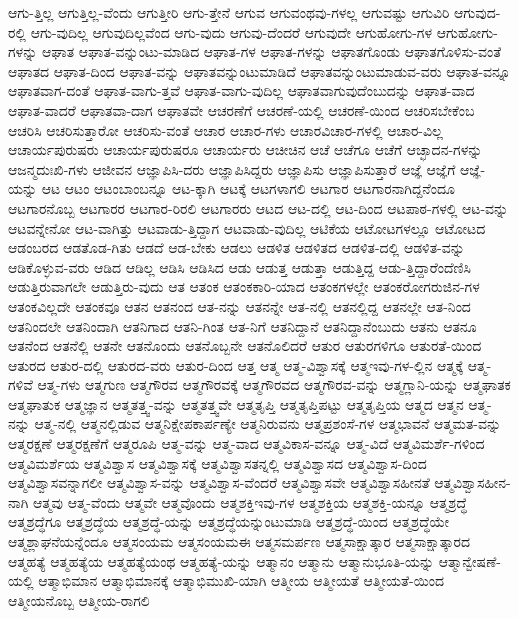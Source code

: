 {ಆಗು-ತ್ತಿಲ್ಲ
ಆಗುತ್ತಿಲ್ಲ-ವೆಂದು
ಆಗುತ್ತೀರಿ
ಆಗು-ತ್ತೇನೆ
ಆಗುವ
ಆಗುವಂಥವು-ಗಳಲ್ಲ
ಆಗುವಷ್ಟು
ಆಗುವಿರಿ
ಆಗುವುದ-ರಲ್ಲಿ
ಆಗು-ವುದಿಲ್ಲ
ಆಗುವುದಿಲ್ಲವೆಂದ
ಆಗು-ವುದು
ಆಗುವು-ದೆಂದರೆ
ಆಗುವುದೇ
ಆಗುಹೋಗು-ಗಳ
ಆಗುಹೋಗು-ಗಳನ್ನು
ಆಘಾತ
ಆಘಾತ-ವನ್ನುಂಟು-ಮಾಡಿದ
ಆಘಾತ-ಗಳ
ಆಘಾತ-ಗಳನ್ನು
ಆಘಾತಗೊಂಡು
ಆಘಾತಗೊಳಿಸು-ವಂತೆ
ಆಘಾತದ
ಆಘಾತ-ದಿಂದ
ಆಘಾತ-ವನ್ನು
ಆಘಾತವನ್ನುಂಟುಮಾಡಿದೆ
ಆಘಾತವನ್ನುಂಟುಮಾಡುವ-ವರು
ಆಘಾತ-ವನ್ನೂ
ಆಘಾತವಾಗ-ದಂತೆ
ಆಘಾತ-ವಾಗು-ತ್ತವೆ
ಆಘಾತ-ವಾಗು-ವುದಿಲ್ಲ
ಆಘಾತವಾಗುವುದೆಂಬುದನ್ನು
ಆಘಾತ-ವಾದ
ಆಘಾತ-ವಾದರೆ
ಆಘಾತವಾ-ದಾಗ
ಆಘಾತವೇ
ಆಚರಣೆಗೆ
ಆಚರಣೆ-ಯಲ್ಲಿ
ಆಚರಣೆ-ಯಿಂದ
ಆಚರಿಸಬೇಕೆಂಬ
ಆಚರಿಸಿ
ಆಚರಿಸುತ್ತಾರೋ
ಆಚರಿಸು-ವಂತೆ
ಆಚಾರ
ಆಚಾರ-ಗಳು
ಆಚಾರವಿಚಾರ-ಗಳಲ್ಲಿ
ಆಚಾರ-ವಿಲ್ಲ
ಆಚಾರ್ಯಪುರುಷರು
ಆಚಾರ್ಯಪುರುಷರೂ
ಆಚಾರ್ಯರು
ಆಚೀಚಿನ
ಆಚೆ
ಆಚೆಗೂ
ಆಚೆಗೆ
ಆಚ್ಛಾದನ-ಗಳನ್ನು
ಆಜನ್ಮದುಃಖಿ-ಗಳು
ಆಜೀವನ
ಆಜ್ಞಾಪಿಸಿ-ದರು
ಆಜ್ಞಾಪಿಸಿದ್ದರು
ಆಜ್ಞಾಪಿಸು
ಆಜ್ಞಾಪಿಸುತ್ತಾರೆ
ಆಜ್ಞೆ
ಆಜ್ಞೆಗೆ
ಆಜ್ಞೆ-ಯನ್ನು
ಆಟ
ಆಟಂ
ಆಟಂಬಾಂಬನ್ನೂ
ಆಟ-ಕ್ಕಾಗಿ
ಆಟಕ್ಕೆ
ಆಟಗಳಾಗಲಿ
ಆಟಗಾರ
ಆಟಗಾರನಾಗಿದ್ದನೆಂದೂ
ಆಟಗಾರನೊಬ್ಬ
ಆಟಗಾರರ
ಆಟಗಾರ-ರಿರಲಿ
ಆಟಗಾರರು
ಆಟದ
ಆಟ-ದಲ್ಲಿ
ಆಟ-ದಿಂದ
ಆಟಪಾಠ-ಗಳಲ್ಲಿ
ಆಟ-ವನ್ನು
ಆಟವನ್ನೇನೋ
ಆಟ-ವಾಗಿತ್ತು
ಆಟವಾಡು-ತ್ತಿದ್ದಾಗ
ಆಟವಾಡು-ವುದಿಲ್ಲ
ಆಟಿಕೆಯ
ಆಟೋಟಗಳಲ್ಲೂ
ಆಟೋಟದ
ಆಡಂಬರದ
ಆಡತೊಡ-ಗಿತು
ಆಡದೆ
ಆಡ-ಬೇಕು
ಆಡಲು
ಆಡಳಿತ
ಆಡಳಿತದ
ಆಡಳಿತ-ದಲ್ಲಿ
ಆಡಳಿತ-ವನ್ನು
ಆಡಿಕೊಳ್ಳುವ-ವರು
ಆಡಿದ
ಆಡಿಲ್ಲ
ಆಡಿಸಿ
ಆಡಿಸಿದ
ಆಡು
ಆಡುತ್ತ
ಆಡುತ್ತಾ
ಆಡುತ್ತಿದ್ದ
ಆಡು-ತ್ತಿದ್ದಾರೆಂದೆಣಿಸಿ
ಆಡುತ್ತಿರುವಾಗಲೇ
ಆಡುತ್ತಿರು-ವುದು
ಆತ
ಆತಂಕ
ಆತಂಕಕಾರಿ-ಯಾದ
ಆತಂಕಗಳಲ್ಲೇ
ಆತಂಕರೋಗರುಜಿನ-ಗಳ
ಆತಂಕವಿಲ್ಲದೇ
ಆತಂಕವೂ
ಆತನ
ಆತನಂದ
ಆತ-ನನ್ನು
ಆತನನ್ನೇ
ಆತ-ನಲ್ಲಿ
ಆತನಲ್ಲಿದ್ದ
ಆತನಲ್ಲೇ
ಆತ-ನಿಂದ
ಆತನಿಂದಲೇ
ಆತನಿಂದಾಗಿ
ಆತನಿಗಾದ
ಆತನಿ-ಗಿಂತ
ಆತ-ನಿಗೆ
ಆತನಿದ್ದಾನೆ
ಆತನಿದ್ದಾನೆಂಬುದು
ಆತನು
ಆತನೂ
ಆತನೆಂದ
ಆತನೆಲ್ಲಿ
ಆತನೇ
ಆತನೊಂದು
ಆತನೊಬ್ಬನೇ
ಆತನೊಲಿದರೆ
ಆತುರ
ಆತುರಗಳಿಗೂ
ಆತುರತೆ-ಯಿಂದ
ಆತುರದ
ಆತುರ-ದಲ್ಲಿ
ಆತುರದ-ವರು
ಆತುರ-ದಿಂದ
ಆತ್ತ
ಆತ್ಮ
ಆತ್ಮ-ವಿಶ್ವಾಸಕ್ಕೆ
ಆತ್ಮಇವು-ಗಳ-ಲ್ಲಿನ
ಆತ್ಮಕ್ಕೆ
ಆತ್ಮ-ಗಳಿವೆ
ಆತ್ಮ-ಗಳು
ಆತ್ಮಗುಣ
ಆತ್ಮಗೌರವ
ಆತ್ಮಗೌರವಕ್ಕೆ
ಆತ್ಮಗೌರವದ
ಆತ್ಮಗೌರವ-ವನ್ನು
ಆತ್ಮಗ್ಲಾನಿ-ಯನ್ನು
ಆತ್ಮಘಾತಕ
ಆತ್ಮಘಾತುಕ
ಆತ್ಮಜ್ಞಾನ
ಆತ್ಮತತ್ತ್ವ-ವನ್ನು
ಆತ್ಮತತ್ತ್ವವೇ
ಆತ್ಮತೃಪ್ತಿ
ಆತ್ಮತೃಪ್ತಿಪಟ್ಟು
ಆತ್ಮತೃಪ್ತಿಯ
ಆತ್ಮದ
ಆತ್ಮನ
ಆತ್ಮ-ನನ್ನು
ಆತ್ಮ-ನಲ್ಲಿ
ಆತ್ಮನಲ್ಲಿಡುವ
ಆತ್ಮನಿಕ್ಷೇಪಕಾರ್ಪಣ್ಯೇ
ಆತ್ಮನಿರುವನು
ಆತ್ಮಪ್ರಶಂಸೆ-ಗಳ
ಆತ್ಮಭಾವನೆ
ಆತ್ಮಮತ-ವನ್ನು
ಆತ್ಮರಕ್ಷಣೆ
ಆತ್ಮರಕ್ಷಣೆಗೆ
ಆತ್ಮರೂಪಿ
ಆತ್ಮ-ವನ್ನು
ಆತ್ಮ-ವಾದ
ಆತ್ಮವಿಕಾಸ-ವನ್ನೂ
ಆತ್ಮ-ವಿದೆ
ಆತ್ಮವಿಮರ್ಶೆ-ಗಳಿಂದ
ಆತ್ಮವಿಮರ್ಶೆಯ
ಆತ್ಮವಿಶ್ವಾಸ
ಆತ್ಮವಿಶ್ವಾಸಕ್ಕೆ
ಆತ್ಮವಿಶ್ವಾಸತನ್ನಲ್ಲಿ
ಆತ್ಮವಿಶ್ವಾಸದ
ಆತ್ಮವಿಶ್ವಾಸ-ದಿಂದ
ಆತ್ಮವಿಶ್ವಾಸವನ್ನಾಗಲೀ
ಆತ್ಮವಿಶ್ವಾಸ-ವನ್ನು
ಆತ್ಮವಿಶ್ವಾಸ-ವೆಂದರೆ
ಆತ್ಮವಿಶ್ವಾಸವೇ
ಆತ್ಮವಿಶ್ವಾಸಹೀನತೆ
ಆತ್ಮವಿಶ್ವಾಸಹೀನ-ನಾಗಿ
ಆತ್ಮವು
ಆತ್ಮ-ವೆಂದು
ಆತ್ಮವೇ
ಆತ್ಮವೊಂದು
ಆತ್ಮಶಕ್ತಿಇವು-ಗಳ
ಆತ್ಮಶಕ್ತಿಯ
ಆತ್ಮಶಕ್ತಿ-ಯನ್ನೂ
ಆತ್ಮಶ್ರದ್ಧೆ
ಆತ್ಮಶ್ರದ್ಧೆಗೂ
ಆತ್ಮಶ್ರದ್ಧೆಯ
ಆತ್ಮಶ್ರದ್ಧೆ-ಯನ್ನು
ಆತ್ಮಶ್ರದ್ಧೆಯನ್ನುಂಟುಮಾಡಿ
ಆತ್ಮಶ್ರದ್ಧೆ-ಯಿಂದ
ಆತ್ಮಶ್ರದ್ಧೆಯೇ
ಆತ್ಮಶ್ಲಾಘನೆಯನ್ನೆಂದೂ
ಆತ್ಮಸಂಯಮ
ಆತ್ಮಸಂಯಮಈ
ಆತ್ಮಸಮರ್ಪಣ
ಆತ್ಮಸಾಕ್ಷಾತ್ಕಾರ
ಆತ್ಮಸಾಕ್ಷಾತ್ಕಾರದ
ಆತ್ಮಹತ್ಯೆ
ಆತ್ಮಹತ್ಯೆಯ
ಆತ್ಮಹತ್ಯೆಯಂಥ
ಆತ್ಮಹತ್ಯೆ-ಯನ್ನು
ಆತ್ಮಾನಂ
ಆತ್ಮಾನು
ಆತ್ಮಾನುಭೂತಿ-ಯನ್ನು
ಆತ್ಮಾನ್ವೇಷಣೆ-ಯಲ್ಲಿ
ಆತ್ಮಾಭಿಮಾನ
ಆತ್ಮಾಭಿಮಾನಕ್ಕೆ
ಆತ್ಮಾಭಿಮುಖಿ-ಯಾಗಿ
ಆತ್ಮೀಯ
ಆತ್ಮೀಯತೆ
ಆತ್ಮೀಯತೆ-ಯಿಂದ
ಆತ್ಮೀಯನೊಬ್ಬ
ಆತ್ಮೀಯ-ರಾಗಲಿ
}
